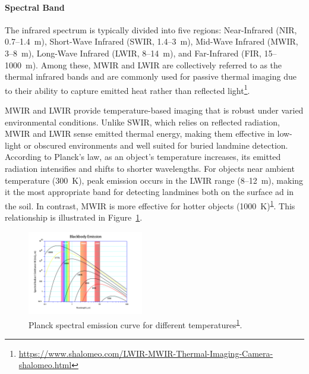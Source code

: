\paragraph{Spectral Band}

The infrared spectrum is typically divided into five regions: Near-Infrared (NIR, 0.7--1.4~\textmu m), Short-Wave Infrared (SWIR, 1.4–3~\textmu m), Mid-Wave Infrared (MWIR, 3–8~\textmu m), Long-Wave Infrared (\gls{LWIR}, 8–14~\textmu m), and Far-Infrared (FIR, 15–1000~\textmu m). Among these, \gls{MWIR} and \gls{LWIR} are collectively referred to as the thermal infrared bands and are commonly used for passive thermal imaging due to their ability to capture emitted heat rather than reflected light\footnote{\label{LWIR}\url{https://www.shalomeo.com/LWIR-MWIR-Thermal-Imaging-Camera-shalomeo.html}}.

\gls{MWIR} and \gls{LWIR} provide temperature-based imaging that is robust under varied environmental conditions. Unlike \gls{SWIR}, which relies on reflected radiation, \gls{MWIR} and \gls{LWIR} sense emitted thermal energy, making them effective in low-light or obscured environments and well suited for buried landmine detection. According to Planck’s law, as an object’s temperature increases, its emitted radiation intensifies and shifts to shorter wavelengths. For objects near ambient temperature (300~K), peak emission occurs in the \gls{LWIR} range (8–12~\textmu m), making it the most appropriate band for detecting landmines both on the surface ad in the soil. In contrast, \gls{MWIR} is more effective for hotter objects (1000~K)\textsuperscript{\ref{LWIR}}. This relationship is illustrated in Figure~\ref{fig:wien_law}.

\begin{figure}[H]
    \centering
    \includegraphics[width=0.45\textwidth]{figs/Huirui/wien_law_plot.png}
    \caption[Planck spectral emission curve]{Planck spectral emission curve for different temperatures\textsuperscript{\ref{LWIR}}.}
    \label{fig:wien_law}
\end{figure}


